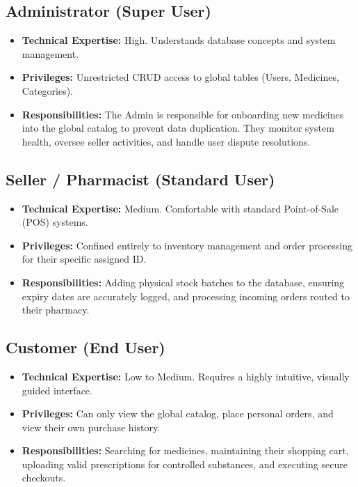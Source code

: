 \documentclass[12pt,a4paper]{report}
\begin{document}
\subsection{Administrator (Super User)}
\begin{itemize}
    \item \textbf{Technical Expertise:} High. Understands database concepts and system management.
    \item \textbf{Privileges:} Unrestricted CRUD access to global tables (Users, Medicines, Categories).
    \item \textbf{Responsibilities:} The Admin is responsible for onboarding new medicines into the global catalog to prevent data duplication. They monitor system health, oversee seller activities, and handle user dispute resolutions.
\end{itemize}

\subsection{Seller / Pharmacist (Standard User)}
\begin{itemize}
    \item \textbf{Technical Expertise:} Medium. Comfortable with standard Point-of-Sale (POS) systems.
    \item \textbf{Privileges:} Confined entirely to inventory management and order processing for their specific assigned ID.
    \item \textbf{Responsibilities:} Adding physical stock batches to the database, ensuring expiry dates are accurately logged, and processing incoming orders routed to their pharmacy.
\end{itemize}

\subsection{Customer (End User)}
\begin{itemize}
    \item \textbf{Technical Expertise:} Low to Medium. Requires a highly intuitive, visually guided interface.
    \item \textbf{Privileges:} Can only view the global catalog, place personal orders, and view their own purchase history.
    \item \textbf{Responsibilities:} Searching for medicines, maintaining their shopping cart, uploading valid prescriptions for controlled substances, and executing secure checkouts.
\end{itemize}
\end{document}
